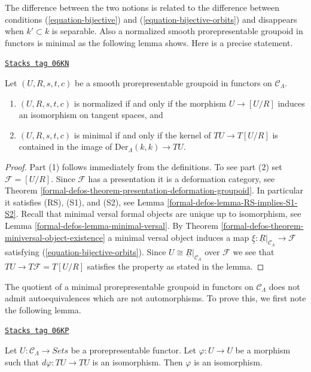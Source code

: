 The difference between the two notions is related to the difference between
conditions (\ref{equation-bijective}) and (\ref{equation-bijective-orbits})
and disappears when $k' \subset k$ is separable. Also a
normalized smooth prorepresentable groupoid in functors is minimal
as the following lemma shows. Here is a precise statement.

\begin{lemma}
\label{formal-defos-lemma-characterize-minimal-groupoid-in-functors}
\href{https://stacks.math.columbia.edu/tag/06KN}{\texttt{Stacks tag 06KN}}

Let $(U, R, s, t, c)$ be a smooth prorepresentable groupoid in
functors on $\mathcal{C}_\Lambda$.
\begin{enumerate}
\item $(U, R, s, t, c)$ is normalized if and only if the morphism
$U \to [U/R]$ induces an isomorphism on tangent spaces, and
\item $(U, R, s, t, c)$ is minimal if and only if the kernel of
$TU \to T[U/R]$ is contained in the image of
$\text{Der}_\Lambda(k, k) \to TU$.
\end{enumerate}
\end{lemma}

\begin{proof}
Part (1) follows immediately from the definitions.
To see part (2) set $\mathcal{F} = [U/R]$. Since $\mathcal{F}$
has a presentation it is a deformation category, see
Theorem \ref{formal-defos-theorem-presentation-deformation-groupoid}.
In particular it satisfies (RS), (S1), and (S2), see
Lemma \ref{formal-defos-lemma-RS-implies-S1-S2}.
Recall that minimal versal formal objects are unique up to isomorphism, see
Lemma \ref{formal-defos-lemma-minimal-versal}.
By
Theorem \ref{formal-defos-theorem-miniversal-object-existence}
a minimal versal object induces a map
$\underline{\xi} : \underline{R}|_{\mathcal{C}_\Lambda} \to \mathcal{F}$
satisfying (\ref{equation-bijective-orbits}). Since
$U \cong \underline{R}|_{\mathcal{C}_\Lambda}$ over $\mathcal{F}$
we see that $TU \to T\mathcal{F} = T[U/R]$ satisfies the property
as stated in the lemma.
\end{proof}

The quotient of a minimal prorepresentable groupoid in functors on $\mathcal
C_\Lambda$ does not admit autoequivalences which are not automorphisms.  To
prove this, we first note the following lemma.

\begin{lemma}
\label{formal-defos-lemma-surjective-morphism-prorepresentable-functor}
\href{https://stacks.math.columbia.edu/tag/06KP}{\texttt{Stacks tag 06KP}}

Let $U: \mathcal{C}_\Lambda \to \textit{Sets}$ be a
prorepresentable functor. Let $\varphi : U \to U$ be a morphism such
that $d\varphi : TU \to TU$ is an isomorphism.  Then $\varphi$ is an
isomorphism.
\end{lemma}

